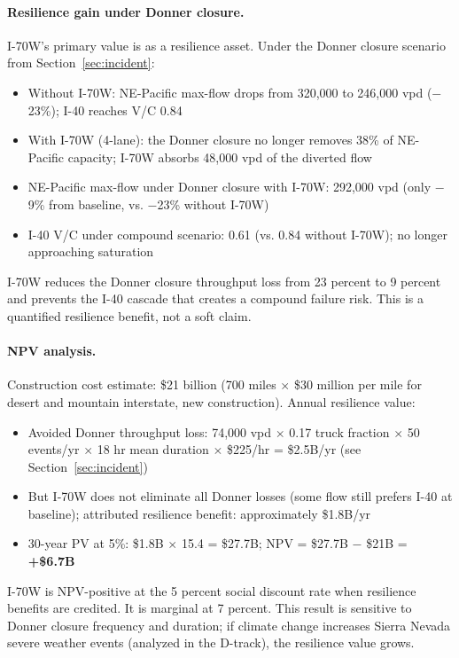 \paragraph{Resilience gain under Donner closure.} I-70W's primary value is as a resilience asset. Under the Donner closure scenario from Section~\ref{sec:incident}:
\begin{itemize}
  \item Without I-70W: NE-Pacific max-flow drops from 320,000 to 246,000 vpd ($-$23\%); I-40 reaches V/C 0.84
  \item With I-70W (4-lane): the Donner closure no longer removes 38\% of NE-Pacific capacity; I-70W absorbs 48,000 vpd of the diverted flow
  \item NE-Pacific max-flow under Donner closure with I-70W: 292,000 vpd (only $-$9\% from baseline, vs. $-$23\% without I-70W)
  \item I-40 V/C under compound scenario: 0.61 (vs. 0.84 without I-70W); no longer approaching saturation
\end{itemize}
I-70W reduces the Donner closure throughput loss from 23 percent to 9 percent and prevents the I-40 cascade that creates a compound failure risk. This is a quantified resilience benefit, not a soft claim.

\paragraph{NPV analysis.} Construction cost estimate: \$21 billion (700 miles $\times$ \$30 million per mile for desert and mountain interstate, new construction). Annual resilience value:
\begin{itemize}
  \item Avoided Donner throughput loss: 74,000 vpd $\times$ 0.17 truck fraction $\times$ 50 events/yr $\times$ 18 hr mean duration $\times$ \$225/hr = \$2.5B/yr (see Section~\ref{sec:incident})
  \item But I-70W does not eliminate all Donner losses (some flow still prefers I-40 at baseline); attributed resilience benefit: approximately \$1.8B/yr
  \item 30-year PV at 5\%: \$1.8B $\times$ 15.4 = \$27.7B; NPV = \$27.7B $-$ \$21B = \textbf{+\$6.7B}
\end{itemize}
I-70W is NPV-positive at the 5 percent social discount rate when resilience benefits are credited. It is marginal at 7 percent. This result is sensitive to Donner closure frequency and duration; if climate change increases Sierra Nevada severe weather events (analyzed in the D-track), the resilience value grows.

